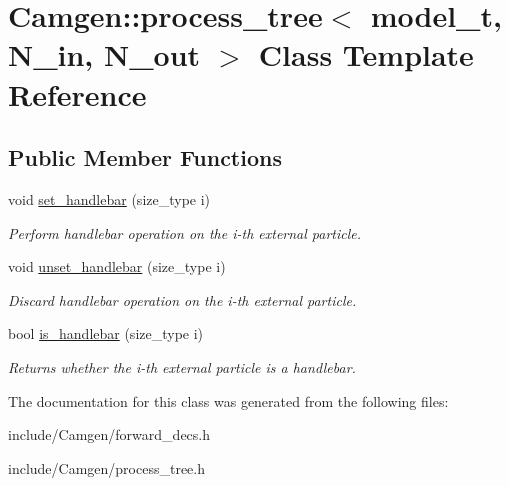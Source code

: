 \hypertarget{a00439}{}\section{Camgen\+:\+:process\+\_\+tree$<$ model\+\_\+t, N\+\_\+in, N\+\_\+out $>$ Class Template Reference}
\label{a00439}
\subsection*{Public Member Functions}
\begin{DoxyCompactItemize}
\item 
\hypertarget{a00439_a11d10e76cdda389030648fca67f4654d}{}void \hyperlink{a00439_a11d10e76cdda389030648fca67f4654d}{set\+\_\+handlebar} (size\+\_\+type i)\label{a00439_a11d10e76cdda389030648fca67f4654d}

\begin{DoxyCompactList}\small\item\em Perform handlebar operation on the i-\/th external particle. \end{DoxyCompactList}\item 
\hypertarget{a00439_a0587b1d77732ece6570b7b6a46cd2725}{}void \hyperlink{a00439_a0587b1d77732ece6570b7b6a46cd2725}{unset\+\_\+handlebar} (size\+\_\+type i)\label{a00439_a0587b1d77732ece6570b7b6a46cd2725}

\begin{DoxyCompactList}\small\item\em Discard handlebar operation on the i-\/th external particle. \end{DoxyCompactList}\item 
\hypertarget{a00439_aefff11915d6f8edaf0e03f95691ed88d}{}bool \hyperlink{a00439_aefff11915d6f8edaf0e03f95691ed88d}{is\+\_\+handlebar} (size\+\_\+type i)\label{a00439_aefff11915d6f8edaf0e03f95691ed88d}

\begin{DoxyCompactList}\small\item\em Returns whether the i-\/th external particle is a handlebar. \end{DoxyCompactList}\end{DoxyCompactItemize}


The documentation for this class was generated from the following files\+:\begin{DoxyCompactItemize}
\item 
include/\+Camgen/forward\+\_\+decs.\+h\item 
include/\+Camgen/process\+\_\+tree.\+h\end{DoxyCompactItemize}
